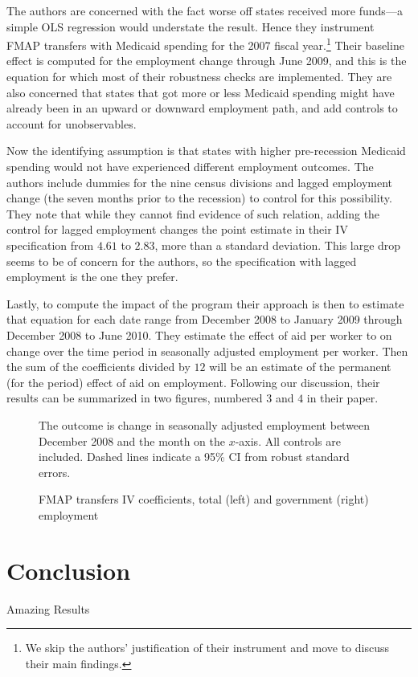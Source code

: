 \documentclass[12pt]{article}
\begin{document}
The authors are concerned with the fact worse off states received more funds---a simple OLS regression would understate the result. Hence they instrument FMAP transfers with Medicaid spending for the 2007 fiscal year.\footnote{We skip the authors' justification of their instrument and move to discuss their main findings.} Their baseline effect is computed for the employment change through June 2009, and this is the equation for which most of their robustness checks are implemented. They are also concerned that states that got more or less Medicaid spending might have already been in an upward or downward employment path, and add controls to account for unobservables.

Now the identifying assumption is that states with higher pre-recession Medicaid spending would not have experienced different employment outcomes. The authors include dummies for the nine census divisions and lagged employment change (the seven months prior to the recession) to control for this possibility. They note that while they cannot find evidence of such relation, adding the control for lagged employment changes the point estimate in their IV specification from $4.61$ to $2.83$, more than a standard deviation. This large drop seems to be of concern for the authors, so the specification with lagged employment is the one they prefer.

Lastly, to compute the impact of the program their approach is then to estimate that equation for each date range from December 2008 to January 2009 through December 2008 to June 2010. They estimate the effect of aid per worker to on change over the time period in seasonally adjusted employment per worker. Then the sum of the coefficients divided by $12$ will be an estimate of the permanent (for the period) effect of aid on employment. Following our discussion, their results can be summarized in two figures, numbered $3$ and $4$ in their paper.
\begin{figure}[ht!]
  \centering
  \caption{FMAP transfers IV coefficients, total (left) and government (right) employment}
  \vspace{3pt}
  \parbox{0.9\textwidth}{\footnotesize The outcome is change in seasonally adjusted employment between December 2008 and the month on the $x$-axis. All controls are included. Dashed lines indicate a 95\% CI from robust standard errors.}
  \label{fig:fig34}
\end{figure}


\section{Conclusion}
\label{sec:conclusion}

Amazing Results

\end{document}
